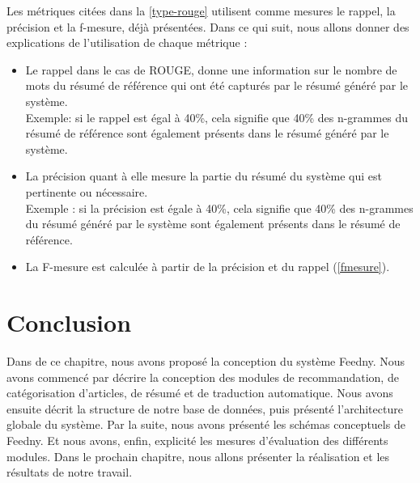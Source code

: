         Les métriques citées dans la \autoref{type-rouge} utilisent comme mesures le rappel, la précision et la f-mesure, déjà présentées. Dans ce qui suit, nous allons donner des explications de l'utilisation de chaque métrique :  
        \begin{itemize}
            \item {Le rappel dans le cas de ROUGE, donne une information sur le nombre de mots du résumé de référence qui ont été capturés par le résumé généré par le système.\\ 
                Exemple: si le rappel est égal à 40\%, cela signifie que 40\% des n-grammes du résumé de référence sont également présents dans le résumé généré par le système.}\\
            \item {La précision quant à elle mesure la partie du résumé du système qui est pertinente ou nécessaire.\\ 
                Exemple : si la précision est égale à 40\%, cela signifie que 40\% des n-grammes du résumé généré par le système sont également présents dans le résumé de référence.}
            \item {La F-mesure est calculée à partir de la précision et du rappel (\autoref{fmesure}).}
        \end{itemize}

\section{Conclusion}
Dans de ce chapitre, nous avons proposé la conception du système \textquotedbl Feedny\textquotedbl. Nous avons commencé par décrire la conception des modules de recommandation, de catégorisation d'articles, de résumé et de traduction automatique. Nous avons ensuite décrit la structure de notre base de données, puis présenté l'architecture globale du système. Par la suite, nous avons présenté les schémas conceptuels de \textquotedbl Feedny\textquotedbl. Et nous avons, enfin, explicité les mesures d'évaluation des différents modules. Dans le prochain chapitre, nous allons présenter la réalisation et les résultats de notre travail.